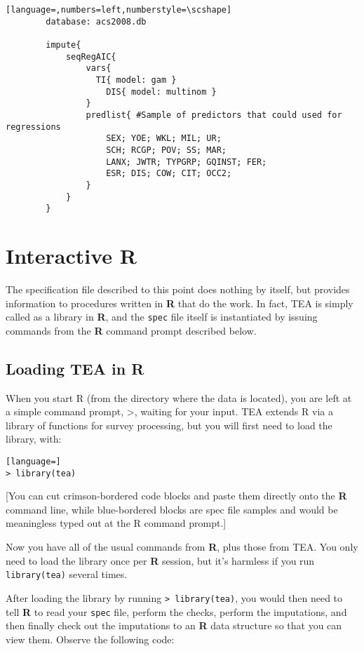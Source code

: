 \documentclass{article}
\begin{document}
        \begin{lstlisting}[language=,numbers=left,numberstyle=\scshape]
        database: acs2008.db

        impute{
            seqRegAIC{
                vars{
                  TI{ model: gam }
                    DIS{ model: multinom }
                }
                predlist{ #Sample of predictors that could used for regressions
                    SEX; YOE; WKL; MIL; UR;
                    SCH; RCGP; POV; SS; MAR;
                    LANX; JWTR; TYPGRP; GQINST; FER;
                    ESR; DIS; COW; CIT; OCC2;
                }
            }
        }

        \end{lstlisting}


\section{Interactive R}
The specification file described to this point does nothing by itself, but provides
information to procedures written in \textbf{R} that do the work. In fact, TEA is simply 
called as a library in \textbf{R}, and the {\tt spec} file itself is instantiated by 
issuing commands from the \textbf{R} command prompt described below.

\subsection{Loading TEA in R}
When you start R (from the directory where the data is located), you are left at a
simple command prompt, >, waiting for your input. TEA extends R via a library of
functions for survey processing, but you will first need to load the library, with:
\begin{lstlisting}[language=]
> library(tea)
\end{lstlisting}

[You can cut crimson-bordered code blocks and paste them directly onto the \textbf{R}
command line, while blue-bordered blocks are spec file samples and
would be meaningless typed out at the R command prompt.]

Now you have all of the usual commands from \textbf{R}, plus those from TEA. You only
need to load the library once per \textbf{R} session, but it's harmless if you run
{\tt library(tea)} several times.

After loading the library by running {\tt > library(tea)}, you would then need to 
tell \textbf{R} to read your {\tt spec} file, perform the checks, perform the imputations, 
and then finally check out the imputations to an \textbf{R} data structure so that you 
can view them. Observe the following code:
\end{document}
